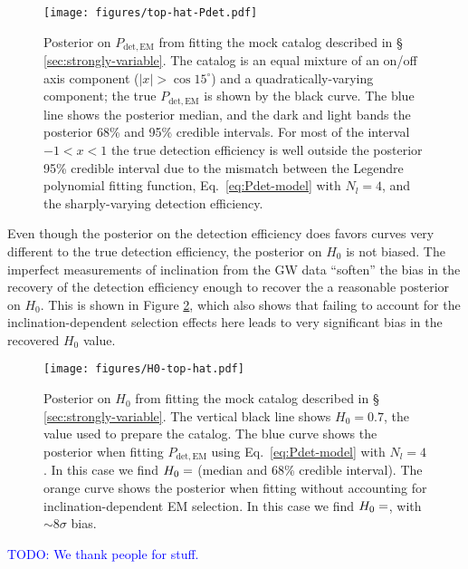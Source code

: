 \documentclass[modern]{aastex631}
\newcommand{\todo}[1]{\textcolor{blue}{TODO: #1}}
\newcommand{\detected}{\mathrm{det}}
\newcommand{\EM}{\mathrm{EM}}
\begin{document}
\begin{figure}
    \texttt{[image: figures/top-hat-Pdet.pdf]}
    \caption{Posterior on $P_{\detected,\EM}$ from fitting the mock catalog
    described in \S\, \ref{sec:strongly-variable}.  The catalog is an equal
    mixture of an on/off axis component ($|x| > \cos 15^\circ$) and a
    quadratically-varying component; the true $P_{\detected,\EM}$ is shown by
    the black curve.  The blue line shows the posterior median, and the dark and
    light bands the posterior 68\% and 95\% credible intervals.  For most of the
    interval $-1 < x < 1$ the true detection efficiency is well outside the
    posterior 95\% credible interval due to the mismatch between the Legendre
    polynomial fitting function, Eq.\ \eqref{eq:Pdet-model} with $N_l = 4$, and
    the sharply-varying detection efficiency.}
    \label{fig:top-hat-Pdet}
\end{figure}

Even though the posterior on the detection efficiency does favors curves very
different to the true detection efficiency, the posterior on $H_0$ is not
biased.  The imperfect measurements of inclination from the GW data ``soften''
the bias in the recovery of the detection efficiency enough to recover the a
reasonable posterior on $H_0$.  This is shown in Figure \ref{fig:H0-top-hat},
which also shows that failing to account for the inclination-dependent selection
effects here leads to very significant bias in the recovered $H_0$ value.

\begin{figure}
    \texttt{[image: figures/H0-top-hat.pdf]}
    \caption{Posterior on $H_0$ from fitting the mock catalog described in \S\,
    \ref{sec:strongly-variable}.  The vertical black line shows $H_0 = 0.7$, the
    value used to prepare the catalog.  The blue curve shows the posterior when
    fitting $P_{\detected,\EM}$ using Eq.\ \eqref{eq:Pdet-model} with $N_l=4$.
    In this case we find $H_0 = \variable{output/H0-top-hat.txt}$ (median and
    68\% credible interval).  The orange curve shows the posterior when fitting
    without accounting for inclination-dependent EM selection.  In this case we
    find $H_0 = \variable{output/H0-top-hat-flat.txt}$, with $\sim 8 \sigma$
    bias.}
    \label{fig:H0-top-hat}
\end{figure}

\begin{acknowledgments}
    \todo{We thank people for stuff.}
\end{acknowledgments}


\clearpage


\end{document}
